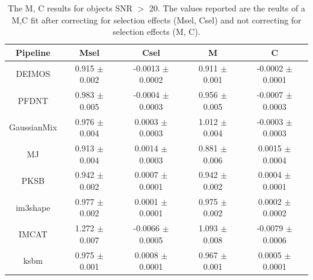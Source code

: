 \begin{table}
        \centering
        \begin{tabular}{|c|c|c|c|c| }  
          \hline
          Pipeline & Msel  & Csel & M  & C   \\ 
          \hline
          DEIMOS & 0.915 $\pm$ 0.002 & -0.0013 $\pm$ 0.0002 & 0.911
          $\pm$ 0.001 & -0.0002 $\pm$ 0.0001 \\
          \hline
          PFDNT & 0.983 $\pm$ 0.005 & -0.0004 $\pm$ 0.0003 & 0.956
          $\pm$ 0.005 & -0.0007 $\pm$ 0.0003 \\
          \hline
          GaussianMix & 0.976 $\pm$ 0.004 & 0.0003 $\pm$ 0.0003 &
          1.012 $\pm$ 0.004 & -0.0003 $\pm$ 0.0003 \\
          \hline
          MJ & 0.913 $\pm$ 0.004 & 0.0014 $\pm$ 0.0003 & 0.881 $\pm$ 0.006 & 0.0015 $\pm$ 0.0004 \\
          \hline
          PKSB & 0.942 $\pm$ 0.002 & 0.0007 $\pm$ 0.0001 & 0.942 $\pm$
          0.002 & 0.0004 $\pm$ 0.0001 \\
          \hline
          im3shape & 0.977 $\pm$ 0.002 & 0.0001 $\pm$ 0.0001 & 0.975 $\pm$ 0.002 & 0.0002 $\pm$ 0.0002 \\
          \hline
          IMCAT & 1.272 $\pm$ 0.007 & -0.0066 $\pm$ 0.0005  & 1.093 $\pm$ 0.008 & -0.0079 $\pm$ 0.0006 \\
          \hline
          ksbm & 0.975 $\pm$ 0.001 & 0.0008 $\pm$ 0.0001 & 0.967 $\pm$ 0.001 & 0.0005 $\pm$ 0.0001 \\
          \hline
        \end{tabular}
        \caption{ The M, C results for objects SNR $>$ 20. The
          values reported are the reults of a M,C fit after
          correcting for selection effects (Msel, Csel) and not
          correcting for selection effects (M, C).}
    \label{table:MC_sel}
\end{table}